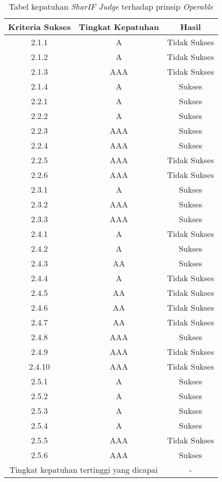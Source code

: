 \begin{table}[H]
	\centering
	\caption{Tabel kepatuhan \textit{SharIF Judge} terhadap prinsip \textit{Operable}}
	\label{tab:kepatuhan_sharif_judge_operable}
	\begin{tabular}{|c|c|c|}
		\hline
		Kriteria Sukses & Tingkat Kepatuhan & Hasil\\
		\hline
		\rowcolor{Pink} 2.1.1 & A & Tidak Sukses\\
		\rowcolor{Pink} 2.1.2 & A & Tidak Sukses\\
		\rowcolor{Red} 2.1.3 & AAA & Tidak Sukses\\
		2.1.4 & A & Sukses\\
		2.2.1 & A & Sukses\\
		2.2.2 & A & Sukses\\
		2.2.3 & AAA & Sukses\\
		2.2.4 & AAA & Sukses\\
		\rowcolor{Red} 2.2.5 & AAA & Tidak Sukses\\
		\rowcolor{Red} 2.2.6 & AAA & Tidak Sukses\\
		2.3.1 & A & Sukses\\
		2.3.2 & AAA & Sukses\\
		2.3.3 & AAA & Sukses\\
		\rowcolor{Pink} 2.4.1 & A & Tidak Sukses\\
		2.4.2 & A & Sukses\\
		2.4.3 & AA & Sukses\\
		\rowcolor{Pink} 2.4.4 & A & Tidak Sukses\\
		\rowcolor{LightRed} 2.4.5 & AA & Tidak Sukses\\
		\rowcolor{LightRed} 2.4.6 & AA & Tidak Sukses\\
		\rowcolor{LightRed} 2.4.7 & AA & Tidak Sukses\\
		2.4.8 & AAA & Sukses\\
		\rowcolor{Red} 2.4.9 & AAA & Tidak Sukses\\
		\rowcolor{Red} 2.4.10 & AAA & Tidak Sukses\\
		2.5.1 & A & Sukses\\
		2.5.2 & A & Sukses\\
		2.5.3 & A & Sukses\\
		2.5.4 & A & Sukses\\
		\rowcolor{Red} 2.5.5 & AAA & Tidak Sukses\\
		2.5.6 & AAA & Sukses\\
		\hline
		\multicolumn{2}{|c|}{Tingkat kepatuhan tertinggi yang dicapai} & - \\
		\hline
	\end{tabular}
\end{table}

